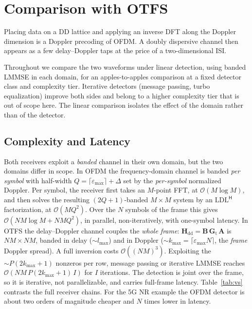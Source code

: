 \documentclass[onecolumn,journal]{IEEEtran}
\theoremstyle{bfhead}
\newcommand{\bH}{\bm{H}}
\newcommand{\bG}{\bm{G}}
\newcommand{\bA}{\bm{A}}
\newcommand{\bB}{\bm{B}}
\begin{document}
\section{Comparison with OTFS}
\label{sec:vs}
Placing data on a DD lattice and applying an inverse DFT along the Doppler
dimension is a Doppler precoding of OFDM. A doubly dispersive channel then
appears as a few delay--Doppler taps at the price of a two-dimensional ISI.

Throughout we compare the two waveforms under linear detection, using banded
LMMSE in each domain, for an apples-to-apples comparison at a fixed detector
class and complexity tier. Iterative detectors (message passing, turbo
equalization) improve both sides and belong to a higher complexity tier that is
out of scope here. The linear comparison isolates the effect of the domain rather
than of the detector.

\subsection{Complexity and Latency}
Both receivers exploit a \emph{banded} channel in their own domain, but the two
domains differ in scope. In OFDM the frequency-domain channel is banded
\emph{per symbol} with half-width $Q=\lceil\varepsilon_{\max}\rceil+\Delta$ set by
the \emph{per-symbol} normalized Doppler. Per symbol, the receiver first takes an
$M$-point FFT, at $\mathcal O(M\log M)$, and then solves the resulting
$(2Q{+}1)$-banded $M\times M$ system by an $\mathrm{LDL}^{\mathsf H}$
factorization, at $\mathcal O(MQ^2)$. Over the $N$ symbols of the frame this gives
$\mathcal O(NM\log M+NMQ^2)$, in parallel, non-iteratively, with one-symbol
latency. In OTFS the delay--Doppler channel couples the
\emph{whole frame}: $\bH_{\mathrm{dd}}=\bB\,\bG_{\mathrm t}\,\bA$ is
$NM\times NM$, banded in delay ($\sim l_{\max}$) and in Doppler
($\sim k_{\max}=\lceil\varepsilon_{\max}N\rceil$, the \emph{frame} Doppler
spread). A full inversion costs $\mathcal O((NM)^3)$. Exploiting the
$\sim\!P(2k_{\max}{+}1)$ nonzeros per row, message passing or iterative LMMSE
reaches $\mathcal O(NM\,P(2k_{\max}{+}1)\,I)$ for $I$ iterations. The detection is
joint over the frame, so it is iterative, not parallelizable, and carries
full-frame latency. Table~\ref{tab:vs} contrasts the full receiver chains. For the
5G NR example the OFDM detector is about two orders of magnitude cheaper and $N$
times lower in latency.
\end{document}

